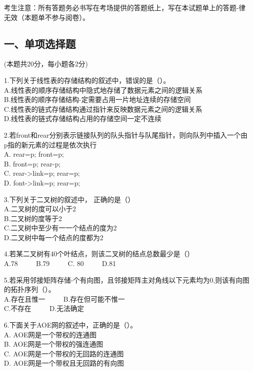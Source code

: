 
考生注意：所有答题务必书写在考场提供的答题纸上，写在本试题单上的答题-律无效（本题单不参与阅卷）。

\subsection{一、单项选择题}
(本题共20分，每小题各2分)

1.下列关于线性表的存储结构的叙述中，错误的是（）。 \\
A.线性表的顺序存储结构中隐式地存储了数据元素之间的逻辑关系 \\
B.线性表的顺序存储结构-定需要占用一片地址连续的存储空间 \\
C.线性表的链式存储结构通过指针来反映数据元素之间的逻辑关系 \\
D.线性表的链式存储结构占用的存储空间一定不连续

2.若front和rear分别表示链接队列的队头指针与队尾指针，则向队列中插入一个由p指的新元素的过程是依次执行 \\
A. rear=p; front=p; \\
B. front=p; rear-p; \\
C. rear->link=p; rear=p; \\
D. font->link=p; rear=p;

3.下列关于二叉树的叙述中， 正确的是（） \\
A.二叉树的度可以小于2 \\
B.二叉树的度等于2 \\
C.二叉树中至少有一一个结点的度为2 \\
D.二叉树中每一个结点的度都为2

4.若某二叉树有40个叶结点，则该二叉树的结点总数最少是（） \\
A.78 $\qquad$ B.79 $\qquad$ C. 80 $\qquad$ D.81

5.若采用邻接矩阵存储-个有向图，且邻接矩阵主对角线以下元素均为0,则该有向图的拓扑序列（）。 \\
A.存在且惟一 $\qquad$ B.存在但可能不惟一 \\
C.不存在 $\qquad$ D.无法确定

6.下面关于AOE网的叙述中，正确的是（）。 \\
A. AOE网是一个带权的连通图 \\
B. AOE网是一个带权的强连通图 \\
C. AOE网是一个带权的无回路的连通图 \\
D. AOE网是一个带权且无回路的有向图


